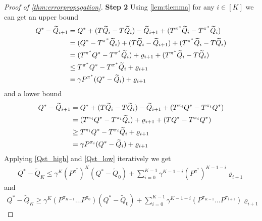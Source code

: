 \documentclass{article}
\theoremstyle{definition}
\newcommand{\wt}{\widetilde}
\begin{document}
\begin{proof}[Proof of \cref{thm:errorpropagation}]
  \textbf{Step 2}
  Using \cref{lem:tlemma} for any $i \in [K]$ we can get an upper bound
  \begin{align}
    Q^* - \wt{Q}_{i+1} &= Q^* + (T\wt{Q}_i - T \wt{Q}_i) - \wt{Q}_{i+1}
    + (T^{\pi^*}\wt{Q}_i - T^{\pi^*}\wt{Q}_i) \notag
    \\ &= (Q^* - T^{\pi^*} \wt{Q}_i) + (T \wt{Q}_i - \wt{Q}_{i+1})
    + (T^{\pi^*}\wt{Q}_i - T \wt{Q}_i) \notag
    \\ &= (T^{\pi^*} Q^* - T^{\pi^*} \wt{Q}_i) + \varrho_{i+1}
    + (T^{\pi^*}\wt{Q}_i - T \wt{Q}_i) \notag
    \\ &\leq T^{\pi^*} Q^* - T^{\pi^*} \wt{Q}_i + \varrho_{i+1} \notag
    \\ &= \gamma P^{\pi^*} (Q^* - \wt{Q}_i) + \varrho_{i+1} \label{Qst_high}
  \end{align}
  and a lower bound
  \begin{align}
    Q^* - \wt{Q}_{i+1} &= Q^* + (T\wt{Q}_i - T \wt{Q}_i) - \wt{Q}_{i+1}
    + (T^{\pi_i}Q^* - T^{\pi_i}Q^*) \notag
    \\ &= (T^{\pi_i}Q^* - T^{\pi_i} \wt{Q}_i) + \varrho_{i+1}
    + (T Q^* - T^{\pi_i} Q^*) \notag
    \\ &\geq T^{\pi_i}Q^* - T^{\pi_i} \wt{Q}_i + \varrho_{i+1} \notag
    \\ &= \gamma P^{\pi_i} (Q^* - \wt{Q}_i) + \varrho_{i+1} \label{Qst_low}
  \end{align}
  Applying \cref{Qst_high} and \cref{Qst_low} iteratively we get  
  \begin{align}
    Q^* - \wt{Q}_K \leq \gamma^K (P^{\pi^*})^K (Q^* - \wt{Q}_0)
    + \sum_{i=0}^{K-1} \gamma^{K-1-i} (P^{\pi^*})^{K-1-i} \varrho_{i+1}
    \label{eq:Qsk_high}
  \end{align}
  and
  \begin{align}
    Q^* - \wt{Q}_K \geq \gamma^K (P^{\pi_{K-1}} \dots P^{\pi_0})(Q^* - \wt{Q}_0)
    + \sum_{i=0}^{K-1}\gamma^{K-1-i}(P^{\pi_{K-1}}\dots P^{\pi_{i+1}})
    \varrho_{i+1} \label{eq:Qsk_low}
  \end{align}


\end{proof}
\end{document}
